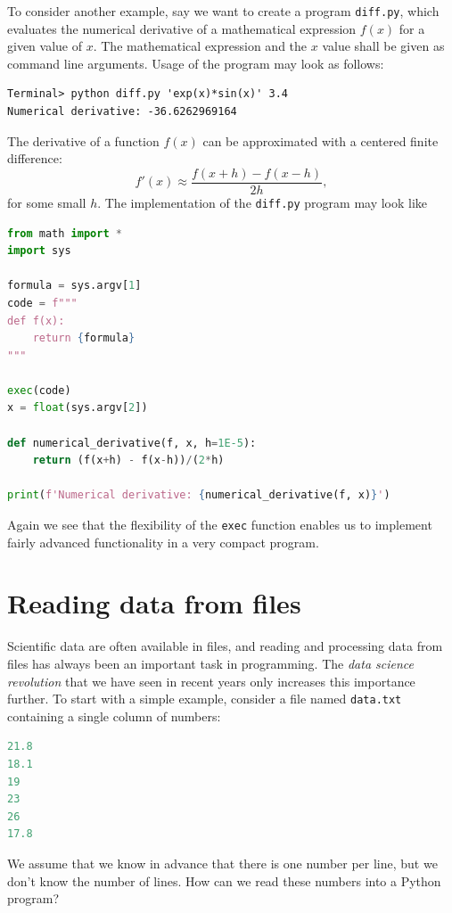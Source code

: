 \documentclass[graybox,envcountchap,sectrefs,final]{svmonodo}
\begin{document}
To consider another example, say we want to create a program \texttt{diff.py}, which evaluates the numerical derivative
of a mathematical expression $f(x)$ for a given value of $x$. The mathematical expression and the $x$ value shall be
given as command line arguments. Usage of the program may look as follows:
\begin{Verbatim}[frame=lines,label=\fbox{{\tiny Terminal}},framesep=2.5mm,framerule=0.7pt]
Terminal> python diff.py 'exp(x)*sin(x)' 3.4
Numerical derivative: -36.6262969164
\end{Verbatim}
The derivative of a function $f(x)$ can be approximated with a centered finite difference:
\[ f'(x)\approx \frac{f(x+h)-f(x-h)}{2h} ,\]
for some small $h$. The implementation of the \texttt{diff.py} program may look like
\begin{lstlisting}[language=Python,style=blue1bar]
from math import *
import sys

formula = sys.argv[1]
code = f"""
def f(x):
    return {formula}
"""

exec(code)
x = float(sys.argv[2])

def numerical_derivative(f, x, h=1E-5):
    return (f(x+h) - f(x-h))/(2*h)

print(f'Numerical derivative: {numerical_derivative(f, x)}')
\end{lstlisting}
Again we see that the flexibility of the \texttt{exec} function enables us to implement fairly advanced functionality in a
very compact program.


\section{Reading data from files}
Scientific data are often available in files, and reading and processing data from files has always been an important
task in programming. The \emph{data science revolution} that we have seen in recent years only increases this importance further.
To start with a simple example, consider a file named \texttt{data.txt} containing a single column of numbers:
\begin{lstlisting}[language=Python,style=blue1]
21.8
18.1
19
23
26
17.8
\end{lstlisting}
We assume that we know in advance that there is one number per line, but we don't know the number of lines.
How can we read these numbers into a Python program?
\end{document}
